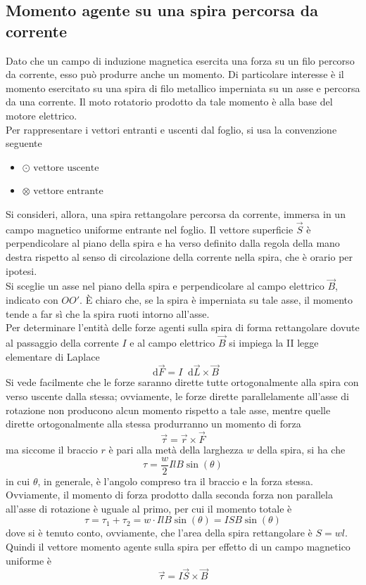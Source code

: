 \documentclass[a4paper]{extarticle}
\newcommand\dif{\mathop{}\!\mathrm{d}}
\begin{document}
\subsection{Momento agente su una spira percorsa da corrente}
Dato che un campo di induzione magnetica esercita una forza su un filo percorso da corrente, esso può produrre anche un momento. Di particolare interesse è il momento esercitato su una spira di filo metallico imperniata su un asse e percorsa da una corrente. Il moto rotatorio prodotto da tale momento è alla base del motore elettrico.\\
Per rappresentare i vettori entranti e uscenti dal foglio, si usa la convenzione seguente
\begin{itemize}
  \item $\odot   \text{ vettore uscente}$
  \item $\otimes \text{ vettore entrante}$
\end{itemize}
Si consideri, allora, una spira rettangolare percorsa da corrente, immersa in un campo magnetico uniforme entrante nel foglio. Il vettore superficie $\vec S$ è perpendicolare al piano della spira e ha verso definito dalla regola della mano destra rispetto al senso di circolazione della corrente nella spira, che è orario per ipotesi.\\
Si sceglie un asse nel piano della spira e perpendicolare al campo elettrico $\vec B$, indicato con $OO'$. È chiaro che, se la spira è imperniata su tale asse, il momento tende a far sì che la spira ruoti intorno all'asse.\\
Per determinare l'entità delle forze agenti sulla spira di forma rettangolare dovute al passaggio della corrente $I$ e al campo elettrico $\vec B$ si impiega la II legge elementare di Laplace
\[\dif \vec F = I \dif \vec L \times \vec B\]
Si vede facilmente che le forze saranno dirette tutte ortogonalmente alla spira con verso uscente dalla stessa; ovviamente, le forze dirette parallelamente all'asse di rotazione non producono alcun momento rispetto a tale asse, mentre quelle dirette ortogonalmente alla stessa produrranno un momento di forza 
\[\vec \tau = \vec r \times \vec F\]
ma siccome il braccio $r$ è pari alla metà della larghezza $w$ della spira, si ha che
\[\tau = \dfrac{w}{2} I l B \sin(\theta)\]
in cui $\theta$, in generale, è l'angolo compreso tra il braccio e la forza stessa. Ovviamente, il momento di forza prodotto dalla seconda forza non parallela all'asse di rotazione è uguale al primo, per cui il momento totale è
\[\tau = \tau_1+\tau_2= w \cdot I l B \sin(\theta) = I S B \sin(\theta)\]
dove si è tenuto conto, ovviamente, che l'area della spira rettangolare è $S=wl$. Quindi il vettore momento agente sulla spira per effetto di un campo magnetico uniforme è
\[\boxed{\vec \tau = I \vec S \times \vec B}\]
\end{document}
